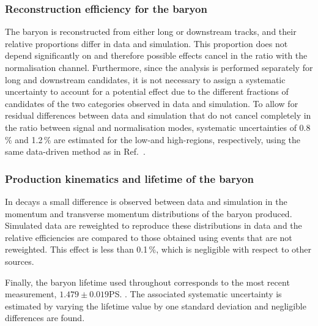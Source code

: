  \subsubsection{Reconstruction efficiency for the \Lz baryon}
 The \Lz baryon is reconstructed from either long or downstream
 tracks, and their relative proportions differ in data and simulation.
 This proportion does not depend significantly on \qsq and therefore
 possible effects cancel in the ratio with the normalisation channel.
 Furthermore, since the analysis is performed separately for long and
 downstream candidates, it is not necessary to assign a systematic
 uncertainty to account for a potential effect due to the different
 fractions of candidates of the two categories observed in data and
 simulation.  To allow for residual differences between data and
 simulation that do not cancel completely in the ratio between signal
 and normalisation modes, systematic uncertainties of 0.8\,\% and
 1.2\,\% are estimated for the low-\qsq and high-\qsq regions,
 respectively, using the same data-driven method as in
 Ref.~\cite{LHCb-PAPER-2014-006}.


 \subsubsection{Production kinematics and lifetime of the \Lb baryon}
  In \decay{\Lb}{\jpsi\Lz} decays a small difference is observed
  between data and simulation in the momentum and transverse momentum
  distributions of the \Lb baryon produced. Simulated data are
  reweighted to reproduce these distributions in data and the relative
  efficiencies are compared to those obtained using events that are
  not reweighted.  This effect is less than 0.1\,\%, which is
  negligible with respect to other sources.

  Finally, the \Lb baryon lifetime used throughout corresponds to the
  most recent \lhcb measurement, $1.479\pm0.019$\ps
  \cite{LHCb-PAPER-2014-003}.  The associated systematic uncertainty
  is estimated by varying the lifetime value by one standard deviation
  and negligible differences are found.


